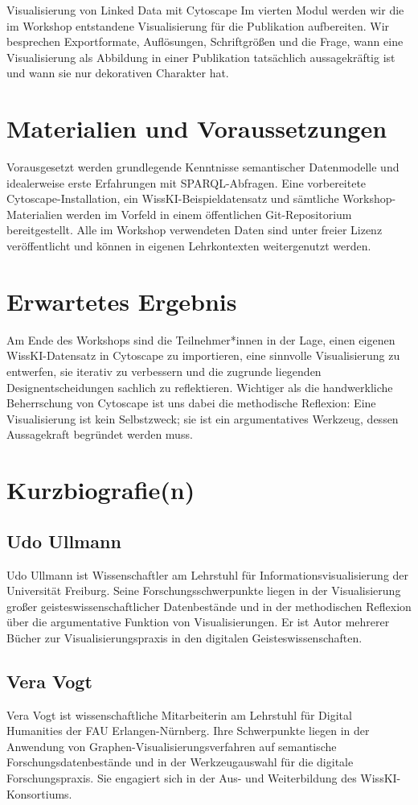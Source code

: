 \begin{beitrag}{Visualisierung von Linked Data mit Cytoscape}
Im vierten Modul werden wir die im Workshop entstandene Visualisierung für die Publikation aufbereiten. Wir besprechen Exportformate, Auflösungen, Schriftgrößen und die Frage, wann eine Visualisierung als Abbildung in einer Publikation tatsächlich aussagekräftig ist und wann sie nur dekorativen Charakter hat.

\section{Materialien und Voraussetzungen}
Vorausgesetzt werden grundlegende Kenntnisse semantischer Datenmodelle und idealerweise erste Erfahrungen mit SPARQL-Abfragen. Eine vorbereitete Cytoscape-Installation, ein WissKI-Beispieldatensatz und sämtliche Workshop-Materialien werden im Vorfeld in einem öffentlichen Git-Repositorium bereitgestellt. Alle im Workshop verwendeten Daten sind unter freier Lizenz veröffentlicht und können in eigenen Lehrkontexten weitergenutzt werden.

\section{Erwartetes Ergebnis}
Am Ende des Workshops sind die Teilnehmer*innen in der Lage, einen eigenen WissKI-Datensatz in Cytoscape zu importieren, eine sinnvolle Visualisierung zu entwerfen, sie iterativ zu verbessern und die zugrunde liegenden Designentscheidungen sachlich zu reflektieren. Wichtiger als die handwerkliche Beherrschung von Cytoscape ist uns dabei die methodische Reflexion: Eine Visualisierung ist kein Selbstzweck; sie ist ein argumentatives Werkzeug, dessen Aussagekraft begründet werden muss.

\end{beitrag}

\section*{Kurzbiografie(n)}

\subsection*{Udo Ullmann}
Udo Ullmann ist Wissenschaftler am Lehrstuhl für Informationsvisualisierung der Universität Freiburg. Seine Forschungsschwerpunkte liegen in der Visualisierung großer geisteswissenschaftlicher Datenbestände und in der methodischen Reflexion über die argumentative Funktion von Visualisierungen. Er ist Autor mehrerer Bücher zur Visualisierungspraxis in den digitalen Geisteswissenschaften.

\subsection*{Vera Vogt}
Vera Vogt ist wissenschaftliche Mitarbeiterin am Lehrstuhl für Digital Humanities der FAU Erlangen-Nürnberg. Ihre Schwerpunkte liegen in der Anwendung von Graphen-Visualisierungsverfahren auf semantische Forschungsdatenbestände und in der Werkzeugauswahl für die digitale Forschungspraxis. Sie engagiert sich in der Aus- und Weiterbildung des WissKI-Konsortiums.
